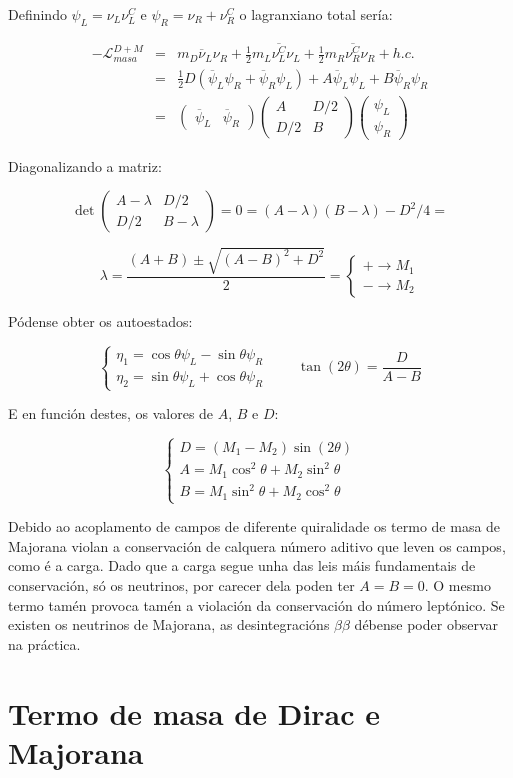 \documentclass[a4paper,10pt]{article}
\newcommand{\beq}{\begin{equation}}
\newcommand{\eeq}{\end{equation}}
\newcommand{\bea}{\begin{eqnarray}}
\newcommand{\eea}{\end{eqnarray}}
\newcommand{\bc}{\begin{cases}}
\newcommand{\ec}{\end{cases}}
\newcommand{\bmx}{\left(\begin{array}}
\newcommand{\emx}{\end{array}\right)}
\newcommand{\barra}[1]{\overline{#1}}
\newcommand{\chula}[1]{\mathcal{#1}}
\begin{document}
Definindo $\psi_L = \nu_L \nu_L^C$ e $\psi_R = \nu_R + \nu_R^C$ o lagranxiano total sería:

\bea
-\chula L_{masa}^{D+M} &=& m_D \barra\nu_L \nu_R + \frac{1}{2} m_L \barra{\nu_L^C} \nu_L + \frac{1}{2} m_R \barra{\nu_R^C} \nu_R + h.c. \nonumber \\
&=& \frac{1}{2} D \left( \barra\psi_L \psi_R + \barra\psi_R \psi_L \right) + A \barra\psi_L \psi_L + B \barra\psi_R \psi_R \nonumber \\
&=& \bmx{cc} \barra\psi_L & \barra\psi_R \emx \bmx{cc} A & D/2 \\ D/2 & B \emx \bmx{c} \psi_L \\ \psi_R \emx
\eea

Diagonalizando a matriz:

\beq
\det{\bmx{cc} A-\lambda & D/2 \\ D/2 & B-\lambda \emx} = 0 = (A-\lambda)(B-\lambda) - D^2/4 =
\eeq

\beq
\lambda= \frac{(A+B) \pm \sqrt{(A-B)^2 + D^2}}{2} = \bc + \rightarrow M_1 \\- \rightarrow M_2 \ec
\eeq

Pódense obter os autoestados:

\beq
\bc
\eta_1 = \cos \theta \psi_L - \sin \theta \psi_R \\
\eta_2 = \sin \theta \psi_L + \cos \theta \psi_R
\ec
\qquad
\tan (2\theta) = \frac{D}{A-B}
\eeq

E en función destes, os valores de $A$, $B$ e $D$:

\beq
\bc
D = (M_1 - M_2) \sin (2\theta)\\
A = M_1 \cos^2 \theta + M_2 \sin^2 \theta\\
B = M_1 \sin^2 \theta + M_2 \cos^2 \theta
\ec
\eeq

Debido ao acoplamento de campos de diferente quiralidade os termo de masa de Majorana violan a conservación de calquera número aditivo que leven os campos, como é a carga. Dado que a carga segue unha das leis máis fundamentais de conservación, só os neutrinos, por carecer dela poden ter $A = B = 0$. O mesmo termo tamén provoca  tamén a violación da conservación do número leptónico. Se existen os neutrinos de Majorana, as desintegracións $\beta\beta$ débense poder observar na práctica.

\section{Termo de masa de Dirac e Majorana}
\end{document}
